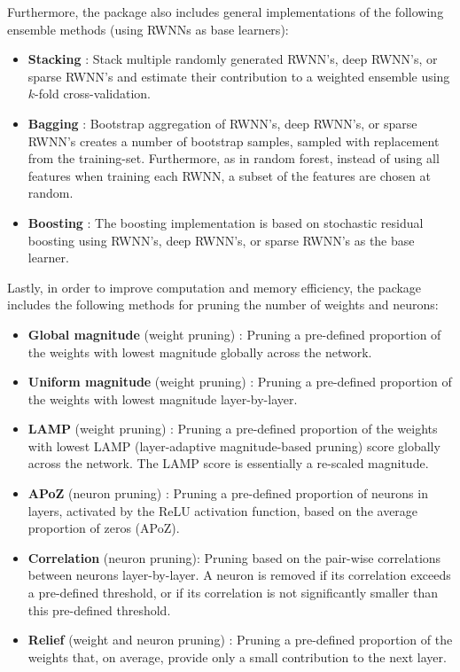 \documentclass[
]{jss}
\providecommand{\tightlist}{%
  \setlength{\itemsep}{0pt}\setlength{\parskip}{0pt}}
\begin{document}
Furthermore, the  package also includes general
implementations of the following ensemble methods (using RWNNs as base
learners):

\begin{itemize}
\tightlist
\item
  \textbf{Stacking} \citep[\citet{Breiman1996a}]{Wolpert1992}: Stack
  multiple randomly generated RWNN's, deep RWNN's, or sparse RWNN's and
  estimate their contribution to a weighted ensemble using \(k\)-fold
  cross-validation.
\item
  \textbf{Bagging} \citep[\citet{Breiman2001},
  \citet{Xin2021}]{Breiman1996b}: Bootstrap aggregation of RWNN's, deep
  RWNN's, or sparse RWNN's creates a number of bootstrap samples,
  sampled with replacement from the training-set. Furthermore, as in
  random forest, instead of using all features when training each RWNN,
  a subset of the features are chosen at random.
\item
  \textbf{Boosting} \citep{Friedman2001}: The boosting implementation is
  based on stochastic residual boosting using RWNN's, deep RWNN's, or
  sparse RWNN's as the base learner.
\end{itemize}

Lastly, in order to improve computation and memory efficiency, the
 package includes the following methods for pruning the number
of weights and neurons:

\begin{itemize}
\tightlist
\item
  \textbf{Global magnitude} (weight pruning)
  \citep[\citet{morcos2019}]{han2016}: Pruning a pre-defined proportion
  of the weights with lowest magnitude globally across the network.
\item
  \textbf{Uniform magnitude} (weight pruning)
  \citep[\citet{morcos2019}]{han2016}: Pruning a pre-defined proportion
  of the weights with lowest magnitude layer-by-layer.
\item
  \textbf{LAMP} (weight pruning) \citep{Lee2021}: Pruning a pre-defined
  proportion of the weights with lowest LAMP (layer-adaptive
  magnitude-based pruning) score globally across the network. The LAMP
  score is essentially a re-scaled magnitude.
\item
  \textbf{APoZ} (neuron pruning) \citep{hu2016}: Pruning a pre-defined
  proportion of neurons in layers, activated by the ReLU activation
  function, based on the average proportion of zeros (APoZ).
\item
  \textbf{Correlation} (neuron pruning): Pruning based on the pair-wise
  correlations between neurons layer-by-layer. A neuron is removed if
  its correlation exceeds a pre-defined threshold, or if its correlation
  is not significantly smaller than this pre-defined threshold.
\item
  \textbf{Relief} (weight and neuron pruning) \citep{Dekhovich2024}:
  Pruning a pre-defined proportion of the weights that, on average,
  provide only a small contribution to the next layer.
\end{itemize}
\end{document}
